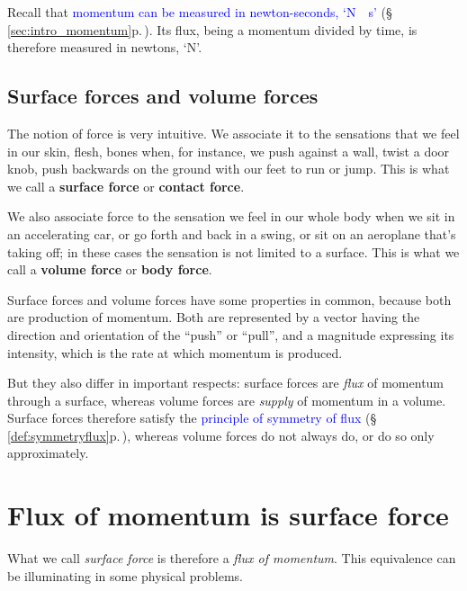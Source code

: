 \documentclass[a4paper,12pt,%
onecolumn,oneside,%
british%
]{memoir}
\renewcommand*{\|}[1][]{\nonscript\:#1\vert\nonscript\:\mathopen{}}
\newcommand*{\sect}{\S}%
\renewcommand*{\autoref}[3][\sect\,\ref]{\textcolor{blue}{#3} {\color{blue}\scriptsize(\faIcon[regular]{eye}\;#1{#2}\;p.\,\pageref{#2})}}
\begin{document}
Recall that \autoref{sec:intro_momentum}{momentum can be measured in newton-seconds, \enquote*{\unit{N\cdot s}}}. Its flux, being a momentum divided by time, is therefore measured in newtons, \enquote*{\unit{N}}.

\subsection{Surface forces and volume forces}
\label{sec:contact_volume_forces}

The notion of force is very intuitive. We associate it to the sensations that we feel in our skin, flesh, bones when, for instance, we push against a wall, twist a door knob, push backwards on the ground with our feet to run or jump. This is what we call a \textbf{surface force} or \textbf{contact force}.

We also associate force to the sensation we feel in our whole body when we sit in an accelerating car, or go forth and back in a swing, or sit on an aeroplane that's taking off; in these cases the sensation is not limited to a surface. This is what we call a \textbf{volume force} or \textbf{body force}.

Surface forces and volume forces have some properties in common, because both are production of momentum. Both are represented by a vector having the direction and orientation of the \enquote{push} or \enquote{pull}, and a magnitude expressing its intensity, which is the rate at which momentum is produced.

But they also differ in important respects: surface forces are \emph{flux} of momentum through a surface, whereas volume forces are \emph{supply} of momentum in a volume. Surface forces therefore satisfy the \autoref{def:symmetryflux}{principle of symmetry of flux}, whereas volume forces do not always do, or do so only approximately.

\section{Flux of momentum is surface force}
\label{sec:visualize_force}

What we call \emph{surface force} is therefore a \emph{flux of momentum}. This equivalence can be illuminating in some physical problems.
\end{document}
